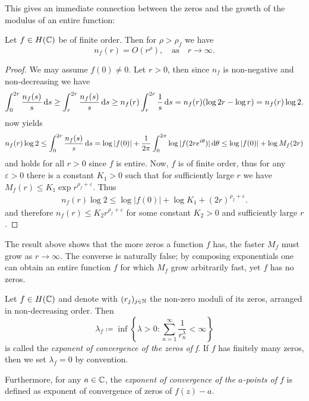 This gives an immediate connection between the zeros and the growth of the modulus of an entire function:

\begin{lemma} \label{lem:zeros-bounded-by-order}
    Let $f \in H(\mathbb{C})$ be of finite order. Then for $\rho > \rho_f$ we have
    $$ n_f(r) = O(r^{\rho}), \quad \textrm{as} \quad r \to \infty. $$
\end{lemma}

\begin{proof}
    We may assume $f(0) \neq 0$. Let $r > 0$, then since $n_f$ is non-negative and non-decreasing we have
    \begin{align*}
        \int_0^{2r} \frac{n_f(s)}{s} \mathop{}\!\mathrm{d} s \geq \int_r^{2r} \frac{n_f(s)}{s} \mathop{}\!\mathrm{d} s \geq n_f(r) \int_r^{2r} \frac{1}{s} \mathop{}\!\mathrm{d} s = n_f(r) (\log 2r - \log r) = n_f(r) \log 2.
    \end{align*}
     now yields
    \begin{equation*}
        n_f(r) \log 2 \leq \int_0^{2r} \frac{n_f(s)}{s} \mathop{}\!\mathrm{d} s = \log \vert f(0) \vert + \frac{1}{2\pi} \int_0^{2 \pi} \log \vert f(2r e^{i \theta}) \vert \mathop{}\!\mathrm{d} \theta \leq \log \vert f(0) \vert + \log M_f(2r)
    \end{equation*}
    and holds for all $r > 0$ since $f$ is entire. Now, $f$ is of finite order, thus for any $\varepsilon > 0$ there is a constant $K_1 > 0$ such that for sufficiently large $r$ we have $M_f(r) \leq K_1 \exp {r^{\rho_f + \varepsilon}}$. Thus
    \begin{align*}
        n_f(r) \log 2 \leq \log \vert f(0) \vert + \log K_1 + (2r)^{\rho_f + \varepsilon}.
    \end{align*}
    and therefore $n_f(r) \leq K_2 r^{\rho_f + \varepsilon}$ for some constant $K_2 > 0$ and sufficiently large $r$.
\end{proof}

The result above shows that the more zeros a function $f$ has, the faster $M_f$ must grow as $r \to \infty$. The converse is naturally false; by composing exponentials one can obtain an entire function $f$ for which $M_f$ grow arbitrarily fast, yet $f$ has no zeros.

\begin{definition} \label{def:zero-exponent}
    Let $f \in H(\mathbb{C})$ and denote with $(r_j)_{j \in \mathbb{N}}$ the non-zero moduli of its zeros, arranged in non-decreasing order. Then
    $$ \lambda_f \coloneqq \inf \left\{ \lambda > 0 : \sum_{n=1}^\infty \frac{1}{r^\lambda_n} < \infty \right\} $$
    is called the \emph{exponent of convergence of the zeros of f}. If $f$ has finitely many zeros, then we set $\lambda_f = 0$ by convention.

    Furthermore, for any $a \in \mathbb{C}$, the \emph{exponent of convergence of the $a$-points of $f$} is defined as exponent of convergence of zeros of $f(z) - a$.
\end{definition}

